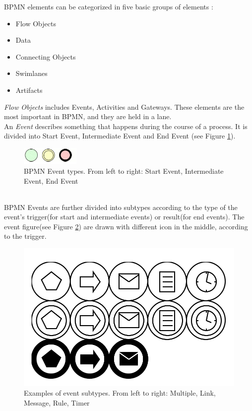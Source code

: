 BPMN elements can be categorized in five basic groups of elements\cite{BPMN2} :
\begin{itemize}
	\item Flow Objects
	\item Data
	\item Connecting Objects
	\item Swimlanes
	\item Artifacts
\end{itemize}
\textit{Flow Objects} includes Events, Activities and Gateways. These elements are the most important in BPMN, and they are held in a lane.\\
An \textit{Event} describes something that happens during the course of a process. It is divided into Start Event, Intermediate Event and End Event (see Figure \ref{fig:events}).
\begin{figure}[h]
	\centering
	\includegraphics[width=0.25\textwidth]{images/events.png}
	\caption{BPMN Event types. From left to right: Start Event, Intermediate Event, End Event}
	\label{fig:events}
\end{figure}
\\
BPMN Events are further divided into subtypes according to the type of the event's trigger(for start and intermediate events) or result(for end events). The event figure(see Figure \ref{fig:event_subtypes}) are drawn with different icon in the middle, according to the trigger.
\begin{figure}[h]
	\centering
	\label{fig:event_subtypes}
	\includegraphics{images/event_types.png}
	\caption{Examples of event subtypes. From left to right: Multiple, Link, Message, Rule, Timer}
\end{figure}
 
